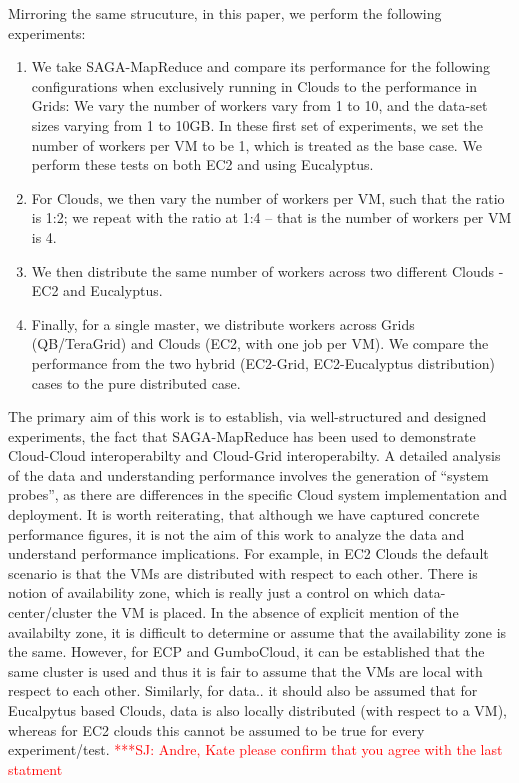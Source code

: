 \documentclass[conference,final]{IEEEtran}
\newcommand{\jhanote}[1]{ {\textcolor{red} { ***SJ: #1 }}}
\newcommand{\jhanote}[1]{}
\newcommand{\sagamapreduce }{SAGA-MapReduce }
\begin{document}
Mirroring the same strucuture, in this paper, we perform the following
experiments:
\begin{enumerate}
\item We take \sagamapreduce and compare its performance for the
  following configurations when exclusively running in Clouds to the
  performance in Grids: We vary the number of workers vary from 1 to
  10, and the data-set sizes varying from 1 to 10GB.  In these first
  set of experiments, we set the number of workers per VM to be 1,
  which is treated as the base case.  We perform these tests on both
  EC2 and using Eucalyptus.
\item For Clouds, we then vary the number of workers per VM, such that
  the ratio is 1:2; we repeat with the ratio at 1:4 -- that is the
  number of workers per VM is 4.
\item We then distribute the same number of workers across two
  different Clouds - EC2 and Eucalyptus.
\item Finally, for a single master, we distribute workers across Grids
  (QB/TeraGrid) and Clouds (EC2, with one job per VM). We
  compare the performance from the two hybrid (EC2-Grid,
  EC2-Eucalyptus distribution) cases to the pure distributed case.
\end{enumerate}

The primary aim of this work is to establish, via well-structured and
designed experiments, the fact that \sagamapreduce has been used to
demonstrate Cloud-Cloud interoperabilty and Cloud-Grid
interoperabilty.  A detailed analysis of the data and understanding
performance involves the generation of ``system probes'', as there are
differences in the specific Cloud system implementation and
deployment.  It is worth reiterating, that although we have captured
concrete performance figures, it is not the aim of this work to
analyze the data and understand performance implications.  For
example, in EC2 Clouds the default scenario is that the VMs are
distributed with respect to each other. There is notion of
availability zone, which is really just a control on which
data-center/cluster the VM is placed. In the absence of explicit
mention of the availabilty zone, it is difficult to determine or
assume that the availability zone is the same. However, for ECP and
GumboCloud, it can be established that the same cluster is used and
thus it is fair to assume that the VMs are local with respect to each
other.  Similarly, for data.. it should also be assumed that for
Eucalpytus based Clouds, data is also locally distributed (with
respect to a VM), whereas for EC2 clouds this cannot be assumed to be
true for every experiment/test. \jhanote{Andre, Kate please confirm
  that you agree with the last statment}
\end{document}
